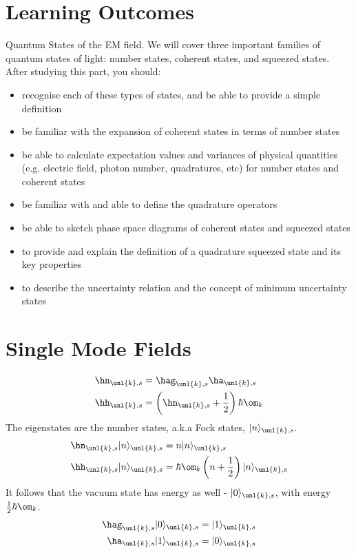 \documentclass[a4paper, 11pt, normalem]{report}
\begin{document}
\section{Learning Outcomes}
Quantum States of the EM field. 
We will cover three important families of quantum states of light: number states, coherent states, and squeezed states. 
After studying this part, you should:
\begin{itemize}
    \item recognise each of these types of states, and be able to provide a simple definition
    \item be familiar with the expansion of coherent states in terms of number states
    \item be able to calculate expectation values and variances of physical quantities (e.g. electric field, photon number, quadratures, etc) for number states and coherent states
    \item be familiar with and able to define the quadrature operators
    \item be able to sketch phase space diagrams of coherent states and squeezed states
    \item to provide and explain the definition of a quadrature squeezed state and its key properties
    \item to describe the uncertainty relation and the concept of minimum uncertainty states
\end{itemize}

\section{Single Mode Fields}
\begin{align}
    \hn_{\unl{k},s} &= \hag_{\unl{k},s}\ha_{\unl{k},s} \\
    \hh_{\unl{k},s} &= \left(\hn_{\unl{k},s}+\frac12\right)\hbar\om_k 
\end{align}
The eigenstates are the number states, a.k.a Fock states, $|n\rangle_{\unl{k},s}$.
\begin{align}
    \hn_{\unl{k},s}|n\rangle_{\unl{k},s} &= n|n\rangle_{\unl{k},s} \\
    \hh_{\unl{k},s}|n\rangle_{\unl{k},s} &= \hbar\om_k\left(n+\frac12\right)|n\rangle_{\unl{k},s} 
\end{align}
It follows that the vacuum state has energy as well - $|0\rangle_{\unl{k},s}$, with energy $\frac12\hbar\om_k$.
\begin{align}
    \hag_{\unl{k},s} |0\rangle_{\unl{k},s} &= |1\rangle_{\unl{k},s} \\
    \ha_{\unl{k},s}|1\rangle_{\unl{k},s} &= |0\rangle_{\unl{k},s}
\end{align}
\end{document}
